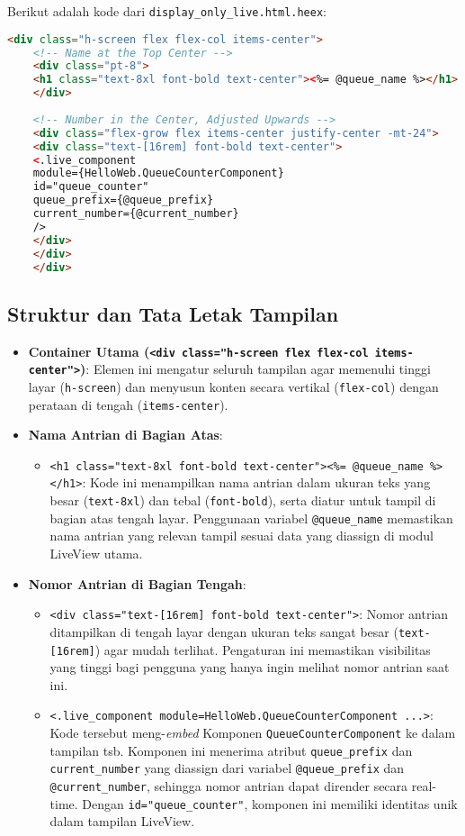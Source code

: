 Berikut adalah kode dari \texttt{display\_only\_live.html.heex}:

\begin{lstlisting}[language=HTML]
	<div class="h-screen flex flex-col items-center">
	<!-- Name at the Top Center -->
	<div class="pt-8">
	<h1 class="text-8xl font-bold text-center"><%= @queue_name %></h1>
	</div>
	
	<!-- Number in the Center, Adjusted Upwards -->
	<div class="flex-grow flex items-center justify-center -mt-24">
	<div class="text-[16rem] font-bold text-center">
	<.live_component
	module={HelloWeb.QueueCounterComponent}
	id="queue_counter"
	queue_prefix={@queue_prefix}
	current_number={@current_number}
	/>
	</div>
	</div>
	</div>
\end{lstlisting}

\subsection{Struktur dan Tata Letak Tampilan}

\begin{itemize}
	\item \textbf{Container Utama (\texttt{<div class="h-screen flex flex-col items-center">})}: Elemen ini mengatur seluruh tampilan agar memenuhi tinggi layar (\texttt{h-screen}) dan menyusun konten secara vertikal (\texttt{flex-col}) dengan perataan di tengah (\texttt{items-center}).
	
	\item \textbf{Nama Antrian di Bagian Atas}: 
	\begin{itemize}
		\item \texttt{<h1 class="text-8xl font-bold text-center"><\%= @queue\_name \%></h1>}: Kode ini menampilkan nama antrian dalam ukuran teks yang besar (\texttt{text-8xl}) dan tebal (\texttt{font-bold}), serta diatur untuk tampil di bagian atas tengah layar. Penggunaan variabel \texttt{@queue\_name} memastikan nama antrian yang relevan tampil sesuai data yang diassign di modul LiveView utama.
	\end{itemize}
	
	\item \textbf{Nomor Antrian di Bagian Tengah}: 
	\begin{itemize}
		\item \texttt{<div class="text-[16rem] font-bold text-center">}: Nomor antrian ditampilkan di tengah layar dengan ukuran teks sangat besar (\texttt{text-[16rem]}) agar mudah terlihat. Pengaturan ini memastikan visibilitas yang tinggi bagi pengguna yang hanya ingin melihat nomor antrian saat ini.
		\item \texttt{<.live\_component module={HelloWeb.QueueCounterComponent} ...>}: Kode tersebut meng-\textit{embed} Komponen \texttt{QueueCounterComponent} ke dalam tampilan tsb. Komponen ini menerima atribut \texttt{queue\_prefix} dan \texttt{current\_number} yang diassign dari variabel \texttt{@queue\_prefix} dan \texttt{@current\_number}, sehingga nomor antrian dapat dirender secara real-time. Dengan \texttt{id="queue\_counter"}, komponen ini memiliki identitas unik dalam tampilan LiveView.
	\end{itemize}
\end{itemize}

